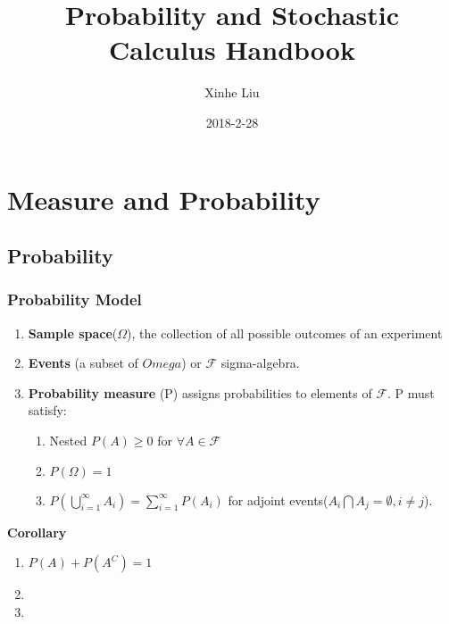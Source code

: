 \documentclass[11pt, openany]{book}              %
\title{\bf Probability and Stochastic Calculus Handbook}    %
\author{Xinhe Liu}              %
\date{2018-2-28}                           %
\begin{document}
\maketitle                              %
\tableofcontents                        %
\mainmatter                             %


\part{Measure and Probability}
\chapter{Probability}                %

\section{Probability Model}

\begin{enumerate}
	\item \textbf{Sample space}($\Omega$), the collection of all possible outcomes of an experiment
	\item \textbf{Events} (a subset of $Omega$) or $\mathcal{F}$ sigma-algebra.
	\item \textbf{Probability measure} (P) assigns probabilities to elements of $\mathcal{F}$. P must satisfy:
	\begin{enumerate}
		\item Nested $P(A) \geq 0$ for $ \forall A \in \mathcal{F}$
		\item $P(\Omega) = 1$ 
		\item $P(\bigcup_{i = 1}^\infty A_i) = \sum_{i = 1}^\infty P(A_i)$ for adjoint events($A_i \bigcap A_j = \emptyset, i \neq j$).
	\end{enumerate}
\end{enumerate}

\textbf{Corollary}

\begin{enumerate}
		\item $P(A) + P(A^C) = 1$
		\item %
		\item %
	\end{enumerate}
\end{document}
